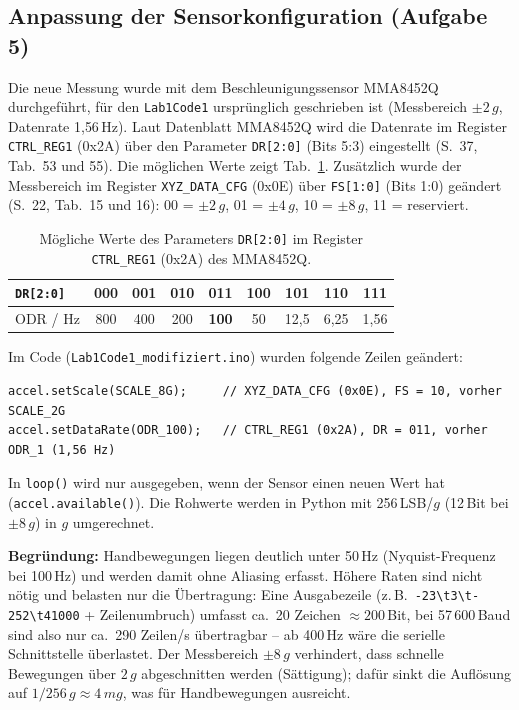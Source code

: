 \documentclass[a4paper,oneside,10pt]{article}
\begin{document}
\subsection{Anpassung der Sensorkonfiguration (Aufgabe 5)}

Die neue Messung wurde mit dem Beschleunigungssensor MMA8452Q durchgeführt, für den
\texttt{Lab1Code1} ursprünglich geschrieben ist (Messbereich $\pm 2\,g$, Datenrate
1{,}56\,Hz). Laut Datenblatt MMA8452Q \cite{mma8452q} wird die Datenrate im Register
\texttt{CTRL\_REG1} (0x2A) über den Parameter \texttt{DR[2:0]} (Bits 5:3)
eingestellt (S.~37, Tab.~53 und 55). Die möglichen Werte zeigt Tab.~\ref{tab:odr}.
Zusätzlich wurde der Messbereich im Register \texttt{XYZ\_DATA\_CFG} (0x0E) über
\texttt{FS[1:0]} (Bits 1:0) geändert (S.~22, Tab.~15 und 16): 00 = $\pm 2\,g$, 01 = $\pm 4\,g$,
10 = $\pm 8\,g$, 11 = reserviert.

\begin{table}[H]
\centering
\small
\caption{Mögliche Werte des Parameters \texttt{DR[2:0]} im Register \texttt{CTRL\_REG1} (0x2A) des MMA8452Q.}
\label{tab:odr}
\begin{tabular}{lcccccccc}
\toprule
\texttt{DR[2:0]} & 000 & 001 & 010 & \textbf{011} & 100 & 101 & 110 & 111 \\
\midrule
ODR / Hz & 800 & 400 & 200 & \textbf{100} & 50 & 12{,}5 & 6{,}25 & 1{,}56 \\
\bottomrule
\end{tabular}
\end{table}

Im Code (\texttt{Lab1Code1\_modifiziert.ino}) wurden folgende Zeilen geändert:
\begin{lstlisting}
accel.setScale(SCALE_8G);     // XYZ_DATA_CFG (0x0E), FS = 10, vorher SCALE_2G
accel.setDataRate(ODR_100);   // CTRL_REG1 (0x2A), DR = 011, vorher ODR_1 (1,56 Hz)
\end{lstlisting}
In \texttt{loop()} wird nur ausgegeben, wenn der Sensor einen neuen Wert hat
(\texttt{accel.available()}). Die Rohwerte werden in Python mit 256\,LSB/$g$
(12\,Bit bei $\pm 8\,g$) in $g$ umgerechnet.

\textbf{Begründung:} Handbewegungen liegen deutlich unter 50\,Hz (Nyquist-Frequenz
bei 100\,Hz) und werden damit ohne Aliasing erfasst. Höhere Raten sind nicht nötig
und belasten nur die Übertragung: Eine Ausgabezeile (z.\,B.\
\texttt{-23\textbackslash t3\textbackslash t-252\textbackslash t41000}
+ Zeilenumbruch) umfasst ca.\ 20 Zeichen $\approx 200$\,Bit, bei 57\,600\,Baud sind
also nur ca.\ 290 Zeilen/s übertragbar -- ab 400\,Hz wäre die serielle Schnittstelle
überlastet. Der Messbereich $\pm 8\,g$ verhindert, dass schnelle Bewegungen über
$2\,g$ abgeschnitten werden (Sättigung); dafür sinkt die Auflösung auf
$1/256\,g \approx 4\,mg$, was für Handbewegungen ausreicht.
\end{document}
